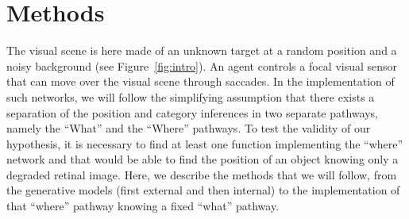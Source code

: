 \section{Methods}
The visual scene is here made of an unknown target at a random position and a noisy background (see Figure~\ref{fig:intro}). An agent controls a focal visual sensor that can move over the visual scene through saccades. In the implementation of such networks, we will follow the simplifying assumption that there exists a separation of the position and category inferences in two separate pathways, namely the ``What'' and the ``Where'' pathways. To test the validity of our hypothesis, it is necessary to find at least one function implementing the ``where'' network and that would be able to find the position of an object knowing only a degraded retinal image. Here, we describe the methods that we will follow, from the generative models (first external and then internal) to the implementation of that ``where'' pathway knowing a fixed ``what'' pathway. %
